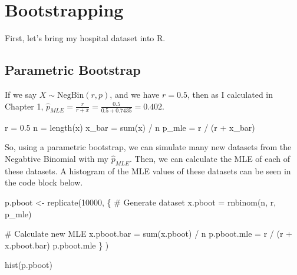 \documentclass[
  letterpaper,
  DIV=11,
  numbers=noendperiod]{scrreprt}
\newenvironment{Shaded}{\begin{snugshade}}{\end{snugshade}}
\newcommand{\NormalTok}[1]{\textcolor[rgb]{0.00,0.23,0.31}{#1}}
\begin{document}
\section{Bootstrapping}\label{bootstrapping}

First, let's bring my hospital dataset into R.

\begin{Shaded}
\end{Shaded}

\subsection{Parametric Bootstrap}\label{parametric-bootstrap}

If we say \(X \sim \text{NegBin}(r, p)\), and we have \(r = 0.5\), then
as I calculated in Chapter 1,
\(\hat{p}_{MLE} = \frac{r}{r + \bar{x}} = \frac{0.5}{0.5 + 0.7435} = 0.402\).

\begin{Shaded}
\begin{Highlighting}[]
\NormalTok{r = 0.5}
\NormalTok{n = length(x)}
\NormalTok{x\_bar = sum(x) / n }
\NormalTok{p\_mle = r / (r + x\_bar)}
\end{Highlighting}
\end{Shaded}

So, using a parametric bootstrap, we can simulate many new datasets from
the Negabtive Binomial with my \(\hat{p}_{MLE}\). Then, we can calculate
the MLE of each of these datasets. A histogram of the MLE values of
these datasets can be seen in the code block below.

\begin{Shaded}
\begin{Highlighting}[]
\NormalTok{p.pboot \textless{}{-} replicate(10000, \{}
\NormalTok{    \# Generate dataset}
\NormalTok{    x.pboot = rnbinom(n, r, p\_mle)}
    
\NormalTok{    \# Calculate new MLE}
\NormalTok{    x.pboot.bar = sum(x.pboot) / n}
\NormalTok{    p.pboot.mle = r / (r + x.pboot.bar)}
\NormalTok{    p.pboot.mle}
\NormalTok{  \}}
\NormalTok{)}

\NormalTok{hist(p.pboot)}
\end{Highlighting}
\end{Shaded}
\end{document}
